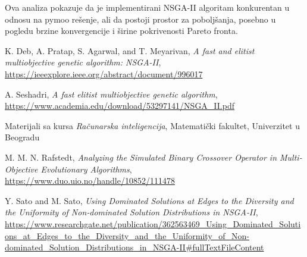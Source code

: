 \documentclass[12pt]{article}
\begin{document}
Ova analiza pokazuje da je implementirani NSGA-II algoritam konkurentan u odnosu na pymoo rešenje, ali da postoji prostor za poboljšanja, posebno u pogledu brzine konvergencije i širine pokrivenosti Pareto fronta.

\renewcommand{\refname}{Literatura}
\begin{thebibliography}{10}

 K. Deb, A. Pratap, S. Agarwal, and T. Meyarivan, \textit{A fast and elitist multiobjective genetic algorithm: NSGA-II}, \url{https://ieeexplore.ieee.org/abstract/document/996017}

 A. Seshadri, \textit{A fast elitist multiobjective genetic algorithm}, \url{https://www.academia.edu/download/53297141/NSGA_II.pdf}

 Materijali sa kursa \textit{Računarska inteligencija}, Matematički fakultet, Univerzitet u Beogradu

 M. M. N. Rafstedt, \textit{Analyzing the Simulated Binary Crossover Operator in Multi-Objective Evolutionary Algorithms}, \url{https://www.duo.uio.no/handle/10852/111478}

 Y. Sato and M. Sato, \textit{Using Dominated Solutions at Edges to the Diversity and the Uniformity of Non‑dominated Solution Distributions in NSGA‑II}, \url{https://www.researchgate.net/publication/362563469_Using_Dominated_Solutions_at_Edges_to_the_Diversity_and_the_Uniformity_of_Non-dominated_Solution_Distributions_in_NSGA-II#fullTextFileContent}


\end{thebibliography}
\end{document}
